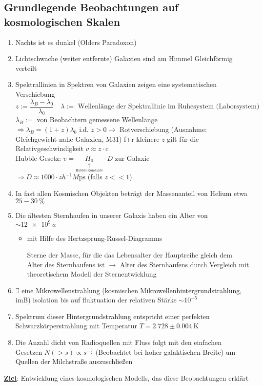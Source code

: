 \subsection{Grundlegende Beobachtungen auf kosmologischen Skalen}
\begin{enumerate}[label={$(\Roman*)$}]
	\item Nachts ist es dunkel (Olders Paradoxon)
	\item Lichtschwache (weiter entfernte) Galaxien sind am Himmel Gleichförmig verteilt
	\item Spektrallinien in Spektren von Galaxien zeigen eine systematischen Verschiebung
		\begin{equation*}
			z:=\frac{\lambda_B-\lambda_0}{\lambda_0}\quad \lambda :=\text{ Wellenlänge der Spektrallinie im Ruhesystem (Laborsystem)}
		\end{equation*}
		$\lambda_B:=$ von Beobachtern gemessene Wellenlänge\\
		$\Rightarrow \lambda_B=(1+z)\lambda_0$ i.d. $z>0\rightarrow $ Rotverschiebung (Ausnahme: Gleichgewicht nahe Galaxien, M31) f+r kleinere $z$ gilt für die Relativgeschwindigkeit $v\approx z\cdot c$\\
		Hubble-Gesetz: $v=\underset{\underset{\text{Hubble-Konstante}}{\uparrow}}{H_0}\cdot D$ zur Galaxie\\
		$\Rightarrow D\approx 1000\cdot z h^{-1}\si{M\ps}$ (falls $z<<1$)
	\item In fast allen Kosmischen Objekten beträgt der Massenanteil von Helium etwa $\num{25}-\SI{30}{\%}$
	\item Die ältesten Sternhaufen in unserer Galaxis haben ein Alter von $\sim\SI{12e9}{a}$
		\begin{itemize}
			\item mit Hilfe des Hertzsprung-Russel-Diagramms
				\begin{figure}[H]
				\end{figure}
				Sterne der Masse, für die das Lebensalter der Hauptreihe gleich dem Alter des Sternhaufens ist $\to$ Alter des Sternhaufens durch Vergleich mit theoretischem Modell der Sternentwicklung
		\end{itemize}
	\item $\exists$ eine Mikrowellenstrahlung (kosmischen Mikrowellenhintergrundstrahlung, imB) isolation bis auf fluktuation der relativen Stärke $\sim 10^{-5}$
	\item Spektrum dieser Hintergrundstrahlung entspricht einer perfekten Schwarzkörperstrahlung mit Temperatur $T=\num{2.728}\pm\SI{0.004}{\K}$
	\item Die Anzahl dicht von Radioquellen mit Fluss folgt mit den einfachen Gesetzen $N(>s)\propto s^{-\frac{3}{2}}$ (Beobachtet bei hoher galaktischen Breite) um Quellen der Milchstraße auszuschließen
\end{enumerate}
\textbf{\underline{Ziel}}: Entwicklung eines kosmologischen Modells, das diese Beobachtungen erklärt

